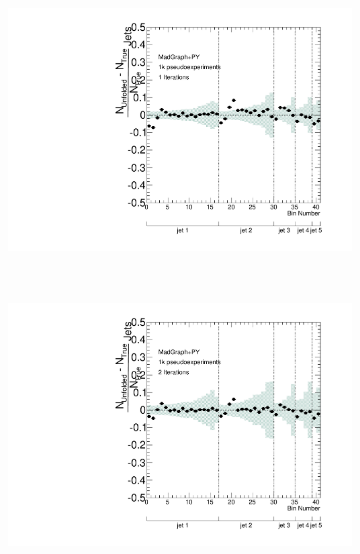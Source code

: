\clearpage
\begin{figure}
\begin{subfigure}[]{0.5\textwidth}
\includegraphics[width=\textwidth]{fig/Stress/110872atlfast/FracBias1Iterations.pdf}
\end{subfigure}
~
\begin{subfigure}[]{0.5\textwidth}
\includegraphics[width=\textwidth]{fig/Stress/110872atlfast/FracBias2Iterations.pdf}
\end{subfigure}
\\
\begin{subfigure}[]{0.5\textwidth}

\end{subfigure}
\end{figure}
